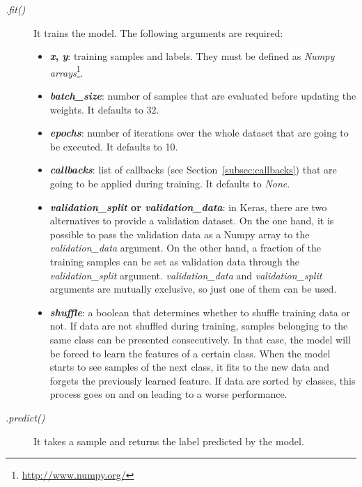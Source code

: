 \begin{description}
	\item[\textit{.fit()}] It trains the model. The following arguments are required:
	\begin{itemize}
		\item \textbf{\textit{x}, \textit{y}}: training samples and labels. They must be defined as \emph{Numpy arrays}\footnote{\url{http://www.numpy.org/}}.
		
		\item \textbf{\textit{batch\_size}}: number of samples that are evaluated before updating the weights. It defaults to 32.
		
		\item \textbf{\textit{epochs}}: number of iterations over the whole dataset that are going to be executed. It defaults to 10.
		
		\item \textbf{\textit{callbacks}}: list of callbacks (see Section~\ref{subsec:callbacks}) that are going to be applied during training. It defaults to \textit{None}.
		
		\item \textbf{\textit{validation\_split} or \textit{validation\_data}}: in Keras, there are two alternatives to provide a validation dataset. On the one hand, it is possible to pass the validation data as a Numpy array to the \textit{validation\_data} argument. On the other hand, a fraction of the training samples can be set as validation data through the \textit{validation\_split} argument. \textit{validation\_data} and  \textit{validation\_split} arguments are mutually exclusive, so just one of them can be used.
		
		\item \textbf{\textit{shuffle}}: a boolean that determines whether to shuffle training data or not. If data are not shuffled during training, samples belonging to the same class can be presented consecutively. In that case, the model will be forced to learn the features of a certain class. When the model starts to see samples of the next class, it fits to the new data and forgets the previously learned feature. If data are sorted by classes, this process goes on and on leading to a worse performance.
	\end{itemize}
\end{description}

\begin{description}
	\item[\textit{.predict()}] It takes a sample and returns the label predicted by the model.
\end{description}

